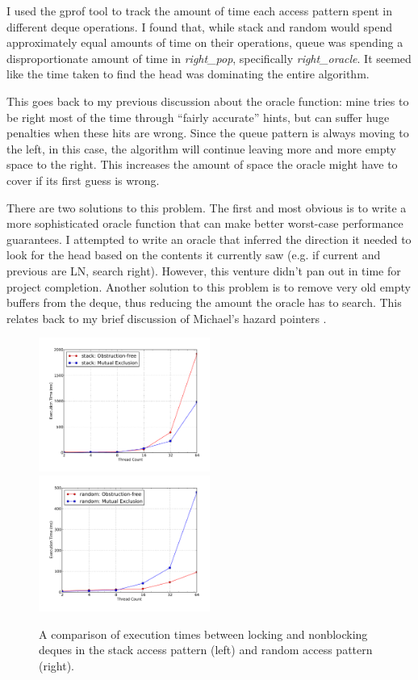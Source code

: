 \documentclass[11pt, letterpaper]{article}
\begin{document}
            I used the gprof tool to track the amount of time each access pattern spent in different deque operations. I found that, while stack and random would spend approximately equal amounts of time on their operations, queue was spending a disproportionate amount of time in \emph{right\_pop}, specifically \emph{right\_oracle}. It seemed like the time taken to find the head was dominating the entire algorithm.

            This goes back to my previous discussion about the oracle function: mine tries to be right most of the time through ``fairly accurate'' hints, but can suffer huge penalties when these hits are wrong. Since the queue pattern is always moving to the left, in this case, the algorithm will continue leaving more and more empty space to the right. This increases the amount of space the oracle might have to cover if its first guess is wrong.

            There are two solutions to this problem. The first and most obvious is to write a more sophisticated oracle function that can make better worst-case performance guarantees. I attempted to write an oracle that inferred the direction it needed to look for the head based on the contents it currently saw (e.g. if current and previous are LN, search right). However, this venture didn't pan out in time for project completion. Another solution to this problem is to remove very old empty buffers from the deque, thus reducing the amount the oracle has to search. This relates back to my brief discussion of Michael's hazard pointers \cite{hazard}.

        \begin{figure}[t!]
            \includegraphics[width=0.5\textwidth]{unbounded/exp/plot/comp_timing_stack.pdf}
            \includegraphics[width=0.5\textwidth]{unbounded/exp/plot/comp_timing_random.pdf}
            \caption{A comparison of execution times between locking and nonblocking deques in the stack access pattern (left) and random access pattern (right).}
            \label{figure::timecomp-plot}
        \end{figure}
\end{document}
